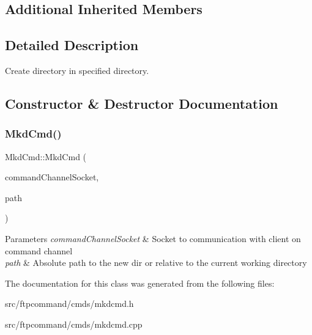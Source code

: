 \subsection*{Additional Inherited Members}


\subsection{Detailed Description}
Create directory in specified directory. 

\subsection{Constructor \& Destructor Documentation}
\mbox{\label{classMkdCmd_ae97092f460ff28dc54172a7d0a4c48ab}} 
\subsubsection{\texorpdfstring{Mkd\+Cmd()}{MkdCmd()}}
{\footnotesize\ttfamily Mkd\+Cmd\+::\+Mkd\+Cmd (\begin{DoxyParamCaption}\item[{int}]{command\+Channel\+Socket,  }\item[{const Q\+String \&}]{path }\end{DoxyParamCaption})}


\begin{DoxyParams}{Parameters}
{\em command\+Channel\+Socket} & Socket to communication with client on command channel \\
\hline
{\em path} & Absolute path to the new dir or relative to the current working directory \\
\hline
\end{DoxyParams}


The documentation for this class was generated from the following files\+:\begin{DoxyCompactItemize}
\item 
src/ftpcommand/cmds/mkdcmd.\+h\item 
src/ftpcommand/cmds/mkdcmd.\+cpp\end{DoxyCompactItemize}
